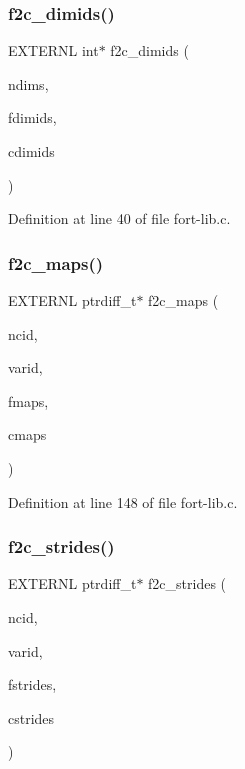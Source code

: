 \subsubsection{\texorpdfstring{f2c\+\_\+dimids()}{f2c\_dimids()}}
{\footnotesize\ttfamily E\+X\+T\+E\+R\+NL int$\ast$ f2c\+\_\+dimids (\begin{DoxyParamCaption}\item[{int}]{ndims,  }\item[{const \hyperlink{ncfortran_8h_a0fd3f9e9fc30661142a1fb549af678e7}{N\+F\+\_\+\+I\+N\+T\+E\+G\+ER} $\ast$}]{fdimids,  }\item[{int $\ast$}]{cdimids }\end{DoxyParamCaption})}



Definition at line 40 of file fort-\/lib.\+c.

\mbox{\label{fort-lib_8c_a67f01ea998846113dc84243e0f0e1201}} 
\subsubsection{\texorpdfstring{f2c\+\_\+maps()}{f2c\_maps()}}
{\footnotesize\ttfamily E\+X\+T\+E\+R\+NL ptrdiff\+\_\+t$\ast$ f2c\+\_\+maps (\begin{DoxyParamCaption}\item[{int}]{ncid,  }\item[{int}]{varid,  }\item[{const \hyperlink{ncfortran_8h_a0fd3f9e9fc30661142a1fb549af678e7}{N\+F\+\_\+\+I\+N\+T\+E\+G\+ER} $\ast$}]{fmaps,  }\item[{ptrdiff\+\_\+t $\ast$}]{cmaps }\end{DoxyParamCaption})}



Definition at line 148 of file fort-\/lib.\+c.

\mbox{\label{fort-lib_8c_acdc8897d97daefc13edaadd990b8a566}} 
\subsubsection{\texorpdfstring{f2c\+\_\+strides()}{f2c\_strides()}}
{\footnotesize\ttfamily E\+X\+T\+E\+R\+NL ptrdiff\+\_\+t$\ast$ f2c\+\_\+strides (\begin{DoxyParamCaption}\item[{int}]{ncid,  }\item[{int}]{varid,  }\item[{const \hyperlink{ncfortran_8h_a0fd3f9e9fc30661142a1fb549af678e7}{N\+F\+\_\+\+I\+N\+T\+E\+G\+ER} $\ast$}]{fstrides,  }\item[{ptrdiff\+\_\+t $\ast$}]{cstrides }\end{DoxyParamCaption})}



